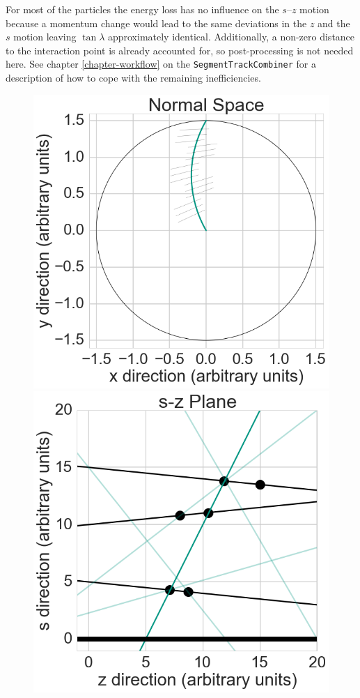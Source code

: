 For most of the particles the energy loss has no influence on the $s$--$z$ motion because a momentum change would lead to the same deviations in the $z$ and the $s$ motion leaving $\tan \lambda$ approximately identical. Additionally, a non-zero distance to the interaction point is already accounted for, so post-processing is not needed here. See chapter \ref{chapter-workflow} on the \texttt{SegmentTrackCombiner} for a description of how to cope with the remaining inefficiencies.


\begin{figure}
 \centering
 \includegraphics[scale=0.3]{figures/theory/stereo_1.png}
 \hspace*{1cm}
 \includegraphics[scale=0.3]{figures/theory/stereo_2.png}
 

\end{figure}
